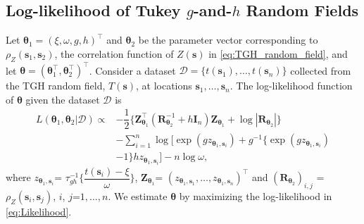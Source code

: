 \documentclass[conference]{IEEEtran}
\begin{document}
\subsection{Log-likelihood of Tukey $g$-and-$h$ Random Fields}
Let $\bm \theta_1 = (\xi,\omega,g,h)^\top$ and $\bm \theta_2$ be the parameter vector corresponding to $ \rho_Z(\bm s_1,\bm s_2)$, the correlation function of $Z(\bm s)$ in \eqref{eq:TGH_random_field}, and let $\bm \theta = (\bm \theta_1^\top,\bm \theta_2^\top)^\top$. Consider a dataset $\mathcal{D} = \{t(\bm s_1),\ldots,t(\bm s_n)\}$ collected from the TGH random field, $T(\bm s)$,  at locations $\bm s_1,\ldots,\bm s_n$. The  log-likelihood function of $\bm \theta$ given the dataset $\mathcal{D}$ is
\begin{equation}
\begin{split}
L(\bm{\theta}_1,\bm{\theta}_2|\mathcal{D})  \propto &-\dfrac{1}{2} \{ \bm{Z}_{\bm{\theta}_1}^\top (\bm{R}_{\bm{\theta}_2}^{-1} + h\bm{I}_n)\bm{Z}_{\bm{\theta}_1} + \log | \bm{R}_{\bm{\theta}_2}| \} \\&- \sum_{i=1}^n \log [ \exp(g z_{\bm{\theta}_1,\bm{s}_i})+g^{-1} \{ \exp(g z_{\bm{\theta}_1,\bm{s}_i})\\& -1 \} h z_{\bm{\theta}_1,\bm{s}_i}] -n \log \omega, 
\end{split}
\label{eq:Likelihood}
\end{equation}
where $z_{\bm{\theta}_1,\bm{s}_i}$= $\tau_{gh}^{-1} \bigg \{ \dfrac{t(\bm{s}_i) - \xi}{\omega} \bigg \}$, $\bm{Z}_{\bm{\theta}_1} $= $(z_{\bm{\theta}_1,\bm{s}_1},\ldots,z_{\bm{\theta}_1,\bm{s}_n})^\top$ and ${(\bm{R}_{\bm{\theta}_2})}_{i,j}$ = $\rho_Z(\bm{s}_i,\bm{s}_j)$, $ i$, $ j$=$1,\ldots,n$. We estimate $ \bm \theta$ by maximizing the log-likelihood in \eqref{eq:Likelihood}.
\end{document}
